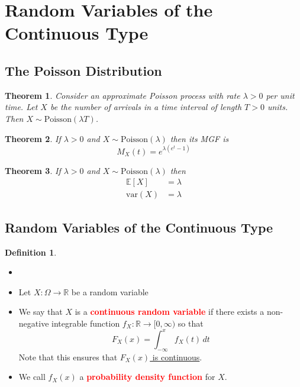 \documentclass{article}
\newcommand{\R}{\mathbb{R}}
\newcommand{\E}{\mathbb{E}}
\newcommand{\var}{\text{var}}
\newcommand{\bfred}[1]{\textcolor{red}{\textbf{#1}}}
\theoremstyle{plain}
\newtheorem{thm}{Theorem}[section]
\theoremstyle{definition}
\newtheorem{defn}{Definition}[section]
\theoremstyle{remark}
\begin{document}
\section{Random Variables of the Continuous Type}

\subsection{The Poisson Distribution}

\begin{thm}
    Consider an approximate Poisson process with rate $\lambda > 0$ per unit time. Let $X$ be the number of arrivals in a time interval of length $T>0$ units. Then $X \sim \text{Poisson}(\lambda T)$.
\end{thm}

\begin{thm}
    If $\lambda > 0$ and $X \sim \text{Poisson}(\lambda)$ then its MGF is \[M_X(t) = e^{\lambda(e^t-1)}\]
\end{thm}

\begin{thm}
    If $\lambda>0$ and $X \sim \text{Poisson}(\lambda)$ then
    \begin{align*}
        \E[X]&=\lambda \\
        \var(X)&=\lambda
    \end{align*}
\end{thm}

\subsection{Random Variables of the Continuous Type}

\begin{defn}
    \begin{itemize}
        \item []
        \item Let $X: \Omega \rightarrow \R$ be a random variable 
        \item We say that $X$ is a \bfred{continuous random variable} if there exists a non-negative integrable function $f_X:\R\rightarrow[0,\infty)$ so that \[F_X(x)=\int_{-\infty}^xf_X(t)\,dt\] Note that this ensures that \underline{$F_X(x)$ is continuous}.
        \item We call $f_X(x)$ a \bfred{probability density function} for $X$.
    \end{itemize}
\end{defn}
\end{document}
